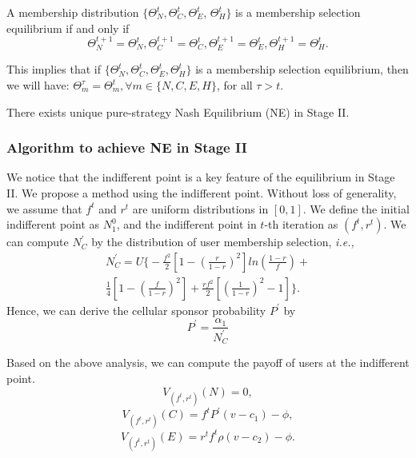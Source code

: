   \begin{myPro}
  A membership distribution $\{\Theta_N^t, \Theta_C^t, \Theta_E^t$, $\Theta_H^t\}$ is a membership selection equilibrium
  if and only if $$\Theta_N^{t+1}=\Theta_N^t, \Theta_C^{t+1}=\Theta_C^t, \Theta_E^{t+1}=\Theta_E^t, \Theta_H^{t+1}=\Theta_H^t.$$
  \end{myPro}

This implies that if $\{\Theta_N^t, \Theta_C^t, \Theta_E^t, \Theta_H^t\}$ is a membership selection equilibrium, then we will have: $\Theta_m^\tau=\Theta_m^t, \forall m\in \{N,C,E,H\}$, for all $\tau>t$.

\begin{myTheo}\label{theo:s2ue}
There exists unique pure-strategy Nash Equilibrium (NE) in Stage II.
\end{myTheo}

\iffalse
\subsubsection{Algorithm to achieve NE in Stage II}

We notice that the indifferent point is a key feature of the equilibrium in Stage II. We propose a method using the indifferent point. Without loss of generality, we assume that $f^t$ and $r^t$ are uniform distributions in $[0,1]$. We define the initial indifferent point as $N_1^0$, and the indifferent point in $t$-th iteration as $(f^t,r^t)$. We can compute $N_C^\prime$ by the distribution of user membership selection, \emph{i.e.,} \\
\begin{equation}
\begin{aligned}
N_C^\prime=U\big\{-\frac{f^2}{2}[1-(\frac{r}{1-r})^2]ln(\frac{1-r}{f})+\\\frac{1}{4}[1-(\frac{f}{1-r})^2]+\frac{rf^2}{2}[(\frac{1}{1-r})^2-1]\big\}. \end{aligned}
\end{equation}
Hence, we can derive the cellular sponsor probability $P^\prime$ by
\begin{equation}
P^\prime=\frac{\alpha_1}{N_C^\prime} \end{equation}
\iffalse
\begin{equation}
P_2^\prime=\frac{\alpha_2}{\frac{1}{4}-\frac{1}{4}f^2\frac{r}{1-r}^2+\frac{1}{2}(fr)^2ln(r)-\frac{1}{2}(\frac{fr}{1-r})^2ln(\frac{1-r}{f})}.
\end{equation}
\fi
Based on the above analysis, we can compute the payoff of users at the indifferent point. $$V_{(f^t,r^t)}(N)=0,$$ $$V_{(f^t,r^t)}(C)=f^tP^\prime(v-c_1)-\phi,$$ $$V_{(f^t,r^t)}(E)=r^tf^t\rho(v-c_2)-\phi.$$

